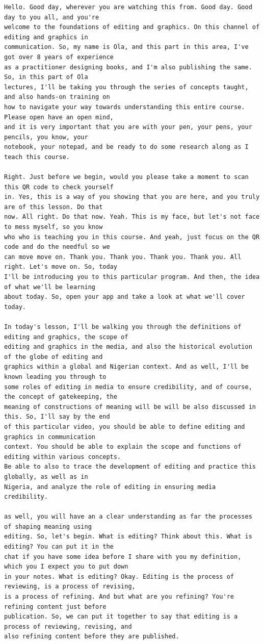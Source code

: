 {\small
\begin{Verbatim}
Hello. Good day, wherever you are watching this from. Good day. Good day to you all, and you're
welcome to the foundations of editing and graphics. On this channel of editing and graphics in
communication. So, my name is Ola, and this part in this area, I've got over 8 years of experience
as a practitioner designing books, and I'm also publishing the same. So, in this part of Ola
lectures, I'll be taking you through the series of concepts taught, and also hands-on training on
how to navigate your way towards understanding this entire course. Please open have an open mind,
and it is very important that you are with your pen, your pens, your pencils, you know, your
notebook, your notepad, and be ready to do some research along as I teach this course.

Right. Just before we begin, would you please take a moment to scan this QR code to check yourself
in. Yes, this is a way of you showing that you are here, and you truly are of this lesson. Do that
now. All right. Do that now. Yeah. This is my face, but let's not face to mess myself, so you know
who who is teaching you in this course. And yeah, just focus on the QR code and do the needful so we
can move move on. Thank you. Thank you. Thank you. Thank you. All right. Let's move on. So, today
I'll be introducing you to this particular program. And then, the idea of what we'll be learning
about today. So, open your app and take a look at what we'll cover today.

In today's lesson, I'll be walking you through the definitions of editing and graphics, the scope of
editing and graphics in the media, and also the historical evolution of the globe of editing and
graphics within a global and Nigerian context. And as well, I'll be known leading you through to
some roles of editing in media to ensure credibility, and of course, the concept of gatekeeping, the
meaning of constructions of meaning will be will be also discussed in this. So, I'll say by the end
of this particular video, you should be able to define editing and graphics in communication
context. You should be able to explain the scope and functions of editing within various concepts.
Be able to also to trace the development of editing and practice this globally, as well as in
Nigeria, and analyze the role of editing in ensuring media credibility.

as well, you will have an a clear understanding as far the processes of shaping meaning using
editing. So, let's begin. What is editing? Think about this. What is editing? You can put it in the
chat if you have some idea before I share with you my definition, which you I expect you to put down
in your notes. What is editing? Okay. Editing is the process of reviewing, is a process of revising,
is a process of refining. And but what are you refining? You're refining content just before
publication. So, we can put it together to say that editing is a process of reviewing, revising, and
also refining content before they are published.


\end{Verbatim}}
